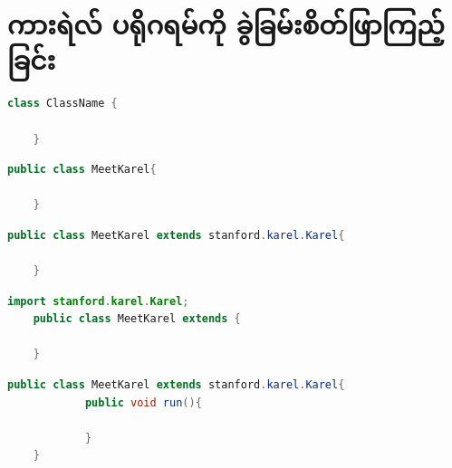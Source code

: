\begin{sloppypar}
\section{ကားရဲလ် ပရိုဂရမ်ကို ခွဲခြမ်းစိတ်ဖြာကြည့်ခြင်း}

\begin{lstlisting}[language = Java, float=ht]
    class ClassName {
            
    }
\end{lstlisting}

\begin{lstlisting}[language = Java, float]
    public class MeetKarel{
            
    }
\end{lstlisting}

\begin{lstlisting}[language = Java, float=hb]
    public class MeetKarel extends stanford.karel.Karel{
            
    }
\end{lstlisting}

\begin{lstlisting}[language = Java, float]
    import stanford.karel.Karel;
    public class MeetKarel extends {
            
    }
\end{lstlisting}

\begin{lstlisting}[language = Java, float]
    public class MeetKarel extends stanford.karel.Karel{
            public void run(){

            }            
    }
\end{lstlisting}

\end{sloppypar}
